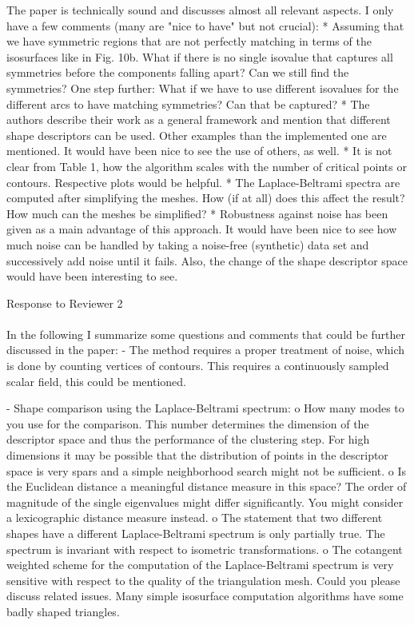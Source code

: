 \documentclass[10pt]{article}
\begin{document}
   The paper is technically sound and discusses almost all relevant aspects.
   I only have a few comments (many are "nice to have" but not crucial):
   * Assuming that we have symmetric regions that are not perfectly matching
   in terms of the isosurfaces like in Fig. 10b. What if there is no single
   isovalue that captures all symmetries before the components falling
   apart? Can we still find the symmetries? One step further: What if we
   have to use different isovalues for the different arcs to have matching
   symmetries? Can that be captured?
   * The authors describe their work as a general framework and mention that
   different shape descriptors can be used. Other examples than the
   implemented one are mentioned. It would have been nice to see the use of
   others, as well. 
   * It is not clear from Table 1, how the algorithm scales with the number
   of critical points or contours. Respective plots would be helpful.
   * The Laplace-Beltrami spectra are computed after simplifying the meshes.
   How (if at all) does this affect the result? How much can the meshes be
   simplified?
   * Robustness against noise has been given as a main advantage of this
   approach. It would have been nice to see how much noise can be handled by
   taking a noise-free (synthetic) data set and successively add noise until
   it fails. Also, the change of the shape descriptor space would have been
   interesting to see.



{\noindent \LARGE Response to Reviewer 2}\\\\

	In the following I summarize some questions and comments that could be
   further discussed in the paper:
   - The method requires a proper treatment of noise, which is done by
   counting vertices of contours. This requires a continuously sampled
   scalar field, this could be mentioned.

   - Shape comparison using the Laplace-Beltrami spectrum:
   o How many modes to you use for the comparison. This number determines
   the dimension of the descriptor space and thus the performance of the
   clustering step. For high dimensions it may be possible that the
   distribution of points in the descriptor space is very spars and a simple
   neighborhood search might not be sufficient. 
   o Is the Euclidean distance a meaningful distance measure in this space?
   The order of magnitude of the single eigenvalues might differ
   significantly. You might consider a lexicographic distance measure
   instead.
   o The statement that two different shapes have a different
   Laplace-Beltrami spectrum is only partially true. The spectrum is
   invariant with respect to isometric transformations.  
   o The cotangent weighted scheme for the computation of the
   Laplace-Beltrami spectrum is very sensitive with respect to the quality
   of the triangulation mesh. Could you please discuss related issues. Many
   simple isosurface computation algorithms have some badly shaped
   triangles.
\end{document}
